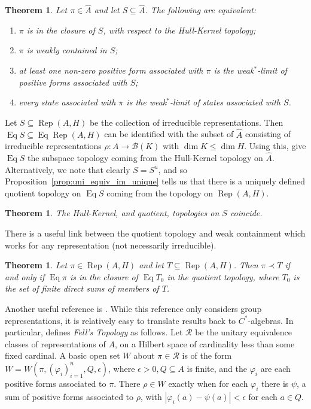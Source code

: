 \documentclass[a4paper,11pt]{article}
\newcommand{\mc}[1]{{\mathcal{#1}}}
\newcommand{\Rep}{\operatorname{Rep}}
\newcommand{\Eq}{\operatorname{Eq}}
\newtheorem{theorem}[lemma]{Theorem}
\begin{document}
\begin{theorem}\label{thm:wk-con-irrep}
Let $\pi\in\hat A$ and let $S\subseteq\hat A$.  The following are equivalent:
\begin{enumerate}
\item $\pi$ is in the closure of $S$, with respect to the Hull-Kernel
topology;
\item $\pi$ is weakly contained in $S$;
\item at least one non-zero positive form associated with $\pi$ is the
weak$^*$-limit of positive forms associated with $S$;
\item every state associated with $\pi$ is the weak$^*$-limit of states
associated with $S$.
\end{enumerate}
\end{theorem}

Let $S\subseteq\Rep(A,H)$ be the collection of irreducible representations.
Then $\Eq S \subseteq \Eq\Rep(A,H)$ can be identified
with the subset of $\hat A$ consisting of irreducible representations
$\rho:A\rightarrow\mc B(K)$ with $\dim K\leq\dim H$.  Using this, give
$\Eq S$ the subspace topology coming from the Hull-Kernel topology on $\hat A$.
Alternatively, we note that clearly $S = S^u$, and so
Proposition~\ref{prop:uni_equiv_im_unique} tells us that there is a
uniquely defined quotient topology on $\Eq S$ coming from the topology
on $\Rep(A,H)$.

\begin{theorem}
The Hull-Kernel, and quotient, topologies on $S$ coincide.
\end{theorem}

There is a useful link between the quotient topology and weak containment which
works for any representation (not necessarily irreducible).

\begin{theorem}\label{thm:top_wk_con}
Let $\pi\in\Rep(A,H)$ and let $T\subseteq\Rep(A,H)$.  Then $\pi \prec T$ if
and only if $\Eq\pi$ is in the closure of $\Eq T_0$ in the quotient topology,
where $T_0$ is the set of finite direct sums of members of $T$.
\end{theorem}

Another useful reference is \cite[Appendix~F]{bhv}.  While this reference only
considers group representations, it is relatively easy to translate results
back to $C^*$-algebras.  In particular, \cite[Definition~F.2.1]{bhv} defines
\emph{Fell's Topology} as follows.  Let $\mc R$ be the unitary equivalence
classes of representations of $A$, on a Hilbert space
of cardinality less than some fixed cardinal.  A basic open set $W$ about
$\pi\in\mc R$ is of the form $W = W(\pi,(\varphi_i)_{i=1}^n,Q,\epsilon)$,
where $\epsilon>0, Q\subseteq A$ is finite, and the $\varphi_i$ are each
positive forms associated to $\pi$.  There $\rho\in W$ exactly when for each
$\varphi_i$ there is $\psi$, a sum of positive forms associated to $\rho$,
with $|\varphi_i(a) - \psi(a)|<\epsilon$ for each $a\in Q$.
\end{document}
